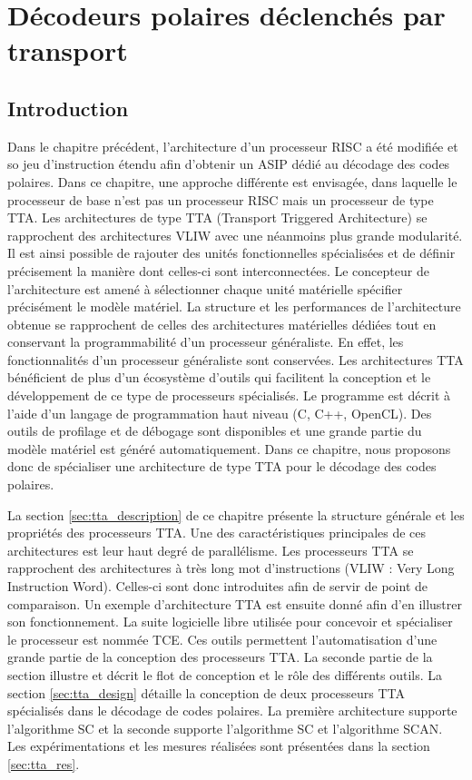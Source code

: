 \chapter{Décodeurs polaires déclenchés par transport} %
\label{chap:tta}

\vspace*{\fill}
\minitocTITI
\vspace*{\fill}
\newpage

\section*{Introduction}
Dans le chapitre précédent, l'architecture d'un processeur RISC a été modifiée et so jeu d'instruction étendu afin d'obtenir un ASIP dédié au décodage des codes polaires. Dans ce chapitre, une approche différente est envisagée, dans laquelle le processeur de base n'est pas un processeur RISC mais un processeur de type TTA.
Les architectures de type TTA (Transport Triggered Architecture) se rapprochent des architectures VLIW avec une néanmoins plus grande modularité. Il est ainsi possible de rajouter des unités fonctionnelles spécialisées et de définir précisement la manière dont celles-ci sont interconnectées. Le concepteur de l'architecture est amené à sélectionner chaque unité matérielle spécifier précisément le modèle matériel. La structure et les performances de l'architecture obtenue se rapprochent de celles des architectures matérielles dédiées tout en conservant la programmabilité d'un processeur généraliste. En effet, les fonctionnalités d'un processeur généraliste sont conservées. Les architectures TTA bénéficient de plus d'un écosystème d'outils qui facilitent la conception et le développement de ce type de processeurs spécialisés. Le programme est décrit à l'aide d'un langage de programmation haut niveau  (C, C++, OpenCL). Des outils de profilage et de débogage sont disponibles et une grande partie du modèle matériel est généré automatiquement. Dans ce chapitre, nous proposons donc de spécialiser une architecture de type TTA pour le décodage des codes polaires.

La section \ref{sec:tta_description} de ce chapitre présente la structure générale et les propriétés des processeurs TTA. Une des caractéristiques principales de ces architectures est leur haut degré de parallélisme. Les processeurs TTA se rapprochent des architectures à très long mot d'instructions (VLIW : Very Long Instruction Word). Celles-ci sont donc introduites afin de servir de point de comparaison. Un exemple d'architecture TTA est ensuite donné afin d'en illustrer son fonctionnement. La suite logicielle libre utilisée pour concevoir et spécialiser le processeur est nommée TCE. Ces outils permettent l'automatisation d'une grande partie de la conception des processeurs TTA. La seconde partie de la section illustre et décrit le flot de conception et le rôle des différents outils. La section \ref{sec:tta_design} détaille la conception de deux processeurs TTA spécialisés dans le décodage de codes polaires. La première architecture supporte l'algorithme SC et la seconde supporte l'algorithme SC et l'algorithme SCAN. Les expérimentations et les mesures réalisées sont présentées dans la section \ref{sec:tta_res}.

